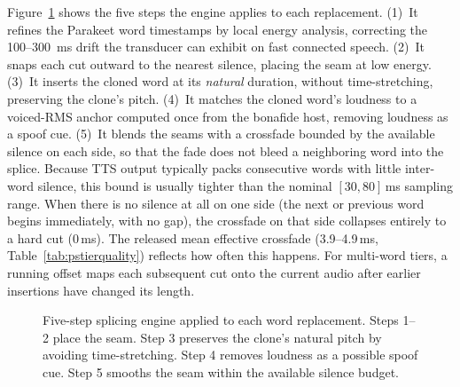 \documentclass[11pt]{report}
\begin{document}
Figure~\ref{fig:splicesteps}
shows the five steps the engine applies to each replacement. (1)~It
refines the Parakeet word timestamps by local energy analysis, correcting
the 100--\SI{300}{\milli\second} drift the transducer can exhibit on fast
connected speech. (2)~It snaps each cut outward to the nearest silence,
placing the seam at low energy. (3)~It inserts the cloned word at its
\emph{natural} duration, without time-stretching, preserving the clone's
pitch. (4)~It matches the cloned word's loudness to a voiced-RMS anchor
computed once from the bonafide host, removing loudness as a spoof cue.
(5)~It blends the seams with a crossfade bounded by the available silence
on each side, so that the fade does not bleed a neighboring word into the
splice.
Because TTS output typically packs consecutive words with little
inter-word silence, this bound is usually tighter than the nominal
$[30,80]$\,ms sampling range. When there is no silence at all on one
side (the next or previous word begins immediately, with no gap), the
crossfade on that side collapses entirely to a hard cut (0\,ms). The
released mean effective crossfade (3.9--4.9\,ms,
Table~\ref{tab:pstierquality}) reflects how often this happens. For
multi-word tiers, a running offset maps each subsequent cut onto the
current audio after earlier insertions have changed its
length.

\begin{figure}[t]
\centering
{}
\caption{Five-step splicing engine applied to each word replacement.
Steps 1--2 place the seam. Step 3 preserves the clone's natural pitch by
avoiding time-stretching. Step 4 removes loudness as a possible spoof
cue. Step 5 smooths the seam within the available silence budget.}
\label{fig:splicesteps}
\end{figure}
\end{document}
